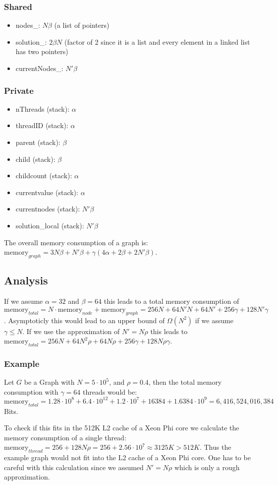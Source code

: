 \documentclass[11pt]{article}
\begin{document}
\subsubsection*{Shared}
\begin{itemize}
\item nodes\_: $N \beta$ (a list of pointers)
\item solution\_: $2\beta N$ (factor of 2 since it is a list and every element in a linked list has two pointers)
\item currentNodes\_: $N' \beta$
\end{itemize}

\subsubsection*{Private}
\begin{itemize}
\item nThreads (stack): $\alpha$
\item threadID (stack): $\alpha$
\item parent (stack): $\beta$
\item child (stack): $\beta$
\item childcount (stack): $\alpha$
\item currentvalue (stack): $\alpha$
\item currentnodes (stack): $N' \beta$
\item solution\_local (stack): $N' \beta$
\end{itemize}

The overall memory consumption of a graph is: $\textrm{memory}_{graph} = 3N \beta + N' \beta + \gamma (4 \alpha + 2 \beta + 2N' \beta)$.

\subsection{Analysis}

If we assume $\alpha = 32$ and $\beta = 64$ this leads to a total memory consumption of
$
\textrm{memory}_{total} = N \cdot \textrm{memory}_{node} + \textrm{memory}_{graph} = 256 N + 64N'N + 64N' + 256\gamma + 128N'\gamma
$.
Asymptoticly this would lead to an upper bound of $\Omega(N^2)$ if we assume $\gamma \leq N$.  If we use the approximation of $N' = N \rho$ this leads to $\textrm{memory}_{total} = 256 N + 64N^2\rho + 64N\rho + 256\gamma + 128N\rho\gamma$.

\subsubsection*{Example}
Let $G$ be a Graph with $N = 5 \cdot 10^5$, and $\rho = 0.4$, then the total memory consumption with $\gamma = 64$ threads would be: $\textrm{memory}_{total} = 1.28 \cdot 10^8 + 6.4 \cdot 10^{12} + 1.2 \cdot 10^7 + 16384 + 1.6384 \cdot 10^9 = 6,416,524,016,384$ Bits.

To check if this fits in the 512K L2 cache of a Xeon Phi core we calculate the memory consumption of a single thread: $\textrm{memory}_{thread} = 256 + 128N\rho = 256 + 2.56 \cdot 10^7 \approx 3125K > 512K$. Thus the example graph would not fit into the L2 cache of a Xeon Phi core. One has to be careful with this calculation since we assumed $N' = N \rho$ which is only a rough approximation.
\end{document}
